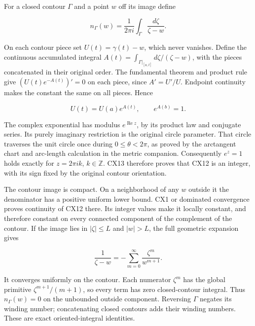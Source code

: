 \documentclass[
  11pt,
]{article}
\makeatletter
\let\ReaderOriginalAnchorStart\hyper@anchorstart
\let\ReaderOriginalAnchorEnd\hyper@anchorend
\let\ReaderPendingAliases\@empty
\def\ReaderArmAliases#1{\gdef\ReaderPendingAliases{#1}}
\def\hyper@anchorstart#1{\ReaderIfNativeAnchorTF{#1}{\ReaderPendingAliases\global\let\ReaderPendingAliases\@empty}{}\ReaderOriginalAnchorStart{#1}}
\makeatother
\begin{document}
For a closed contour \(\Gamma\) and a point \(w\) off its image define

\[
n_\Gamma(w)=\frac1{2\pi i}\int_\Gamma\frac{d\zeta}{\zeta-w}.
\tag{CX12}
\]

On each contour piece set \(U(t)=\gamma(t)-w\), which never vanishes.
Define the continuous accumulated integral
\(A(t)=\int_{\Gamma|_{[a,t]}}d\zeta/(\zeta-w)\), with the pieces
concatenated in their original order. The fundamental theorem and
product rule give \((U(t)e^{-A(t)})'=0\) on each piece, since
\(A'=U'/U\). Endpoint continuity makes the constant the same on all
pieces. Hence

\[
U(t)=U(a)e^{A(t)},\qquad e^{A(b)}=1 .
\tag{CX13}
\]

The complex exponential has modulus \(e^{\operatorname{Re}z}\), by its
product law and conjugate series. Its purely imaginary restriction is
the original circle parameter. That circle traverses the unit circle
once during \(0\leq\theta<2\pi\), as proved by the arctangent chart and
arc-length calculation in the metric companion. Consequently \(e^z=1\)
holds exactly for \(z=2\pi i k\), \(k\in\mathbb Z\). CX13 therefore
proves that CX12 is an integer, with its sign fixed by the original
contour orientation.

The contour image is compact. On a neighborhood of any \(w\) outside it
the denominator has a positive uniform lower bound. CX1 or dominated
convergence proves continuity of CX12 there. Its integer values make it
locally constant, and therefore constant on every connected component of
the complement of the contour. If the image lies in \(|\zeta|\leq L\)
and \(|w|>L\), the full geometric expansion gives

\[
\frac1{\zeta-w}
 =-\sum_{m=0}^{\infty}\frac{\zeta^m}{w^{m+1}}.
\tag{CX14}
\]

It converges uniformly on the contour. Each numerator \(\zeta^m\) has
the global primitive \(\zeta^{m+1}/(m+1)\), so every term has zero
closed-contour integral. Thus \(n_\Gamma(w)=0\) on the unbounded outside
component. Reversing \(\Gamma\) negates its winding number;
concatenating closed contours adds their winding numbers. These are
exact oriented-integral identities.

\ReaderArmAliases{\ReaderOriginalAnchorStart{AN03-CN-COMPLEX-005}\ReaderOriginalAnchorEnd\begingroup\expandafter\def\csname @currentHref\endcsname{AN03-CN-COMPLEX-005}\label{AN03-CN-COMPLEX-005}\endgroup\ReaderOriginalAnchorStart{the-complete-contour-theorem-and-every-finite-pole-residue}\ReaderOriginalAnchorEnd}
\end{document}
